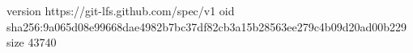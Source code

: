 version https://git-lfs.github.com/spec/v1
oid sha256:9a065d08e99668dae4982b7bc37df82cb3a15b28563ee279c4b09d20ad00b229
size 43740
